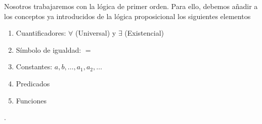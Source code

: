 Nosotros trabajaremos con la lógica de primer orden. Para ello, debemos añadir
a los conceptos ya introducidos de la lógica proposicional los siguientes
elementos
\begin{enumerate}
\item Cuantificadores: $\forall$ (Universal) y $\exists$ (Existencial)
\item Símbolo de igualdad: $=$
\item Constantes: $a,b,\dots,a_1,a_2,\dots$
\item Predicados
\item Funciones
\end{enumerate}
.

